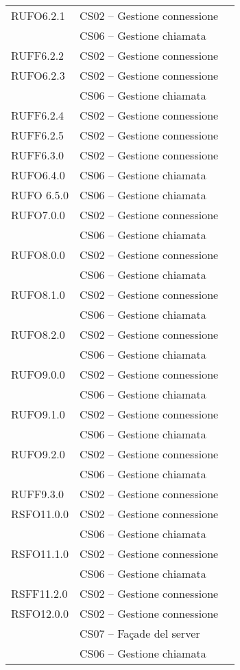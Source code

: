 \begin{center}
\begin{longtable}{lp{}l}
RUFO6.2.1 & CS02 -- Gestione connessione \\
  & CS06 -- Gestione chiamata \\
RUFF6.2.2 & CS02 -- Gestione connessione \\
RUFO6.2.3 & CS02 -- Gestione connessione \\
  & CS06 -- Gestione chiamata \\
RUFF6.2.4 & CS02 -- Gestione connessione \\
RUFF6.2.5 & CS02 -- Gestione connessione \\
RUFF6.3.0 & CS02 -- Gestione connessione \\
RUFO6.4.0   & CS06 -- Gestione chiamata \\
RUFO 6.5.0  & CS06 -- Gestione chiamata \\
RUFO7.0.0 & CS02 -- Gestione connessione \\
  & CS06 -- Gestione chiamata \\
RUFO8.0.0 & CS02 -- Gestione connessione \\
  & CS06 -- Gestione chiamata \\
RUFO8.1.0 & CS02 -- Gestione connessione \\
  & CS06 -- Gestione chiamata \\
RUFO8.2.0 & CS02 -- Gestione connessione \\
  & CS06 -- Gestione chiamata \\
RUFO9.0.0 & CS02 -- Gestione connessione \\
  & CS06 -- Gestione chiamata \\
RUFO9.1.0 & CS02 -- Gestione connessione \\
  & CS06 -- Gestione chiamata \\
RUFO9.2.0 & CS02 -- Gestione connessione \\
  & CS06 -- Gestione chiamata \\
RUFF9.3.0 & CS02 -- Gestione connessione \\
RSFO11.0.0 & CS02 -- Gestione connessione \\
  & CS06 -- Gestione chiamata \\
RSFO11.1.0 & CS02 -- Gestione connessione \\
  & CS06 -- Gestione chiamata \\
RSFF11.2.0 & CS02 -- Gestione connessione \\
RSFO12.0.0 & CS02 -- Gestione connessione \\
 & CS07 -- Façade del server \\
   & CS06 -- Gestione chiamata \\

\end{longtable}
\end{center}
